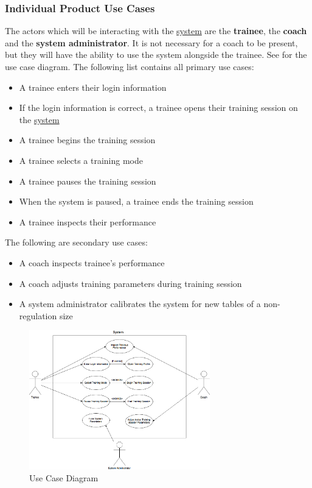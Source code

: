 \documentclass[11pt]{article}
\begin{document}
\subsubsection{Individual Product Use Cases}
The actors which will be interacting with the \hyperref[sec:definitions]{system} are the \textbf{trainee}, the \textbf{coach} and the \textbf{system administrator}. It is not necessary for a coach to be present, but they will have the ability to use the system alongside the trainee. See  for the use case diagram. The following list contains all primary use cases:
\begin{itemize}
\item A trainee enters their login information
\item If the login information is correct, a trainee opens their training session on the \hyperref[sec:definitions]{system}
\item A trainee begins the training session
\item A trainee selects a training mode
\item A trainee pauses the training session
\item When the system is paused, a trainee ends the training session
\item A trainee inspects their performance
\end{itemize}
The following are secondary use cases:
\begin{itemize}
\item A coach inspects trainee's performance
\item A coach adjusts training parameters during training session
\item A system administrator calibrates the system for new tables of a non-regulation size
\end{itemize}

\begin{figure}[H]
   \centering
   \includegraphics[width=0.7\textwidth]{diagrams/UseCase.png}
   \caption{Use Case Diagram}
   \label{fig:usecase}
\end{figure}
\end{document}
